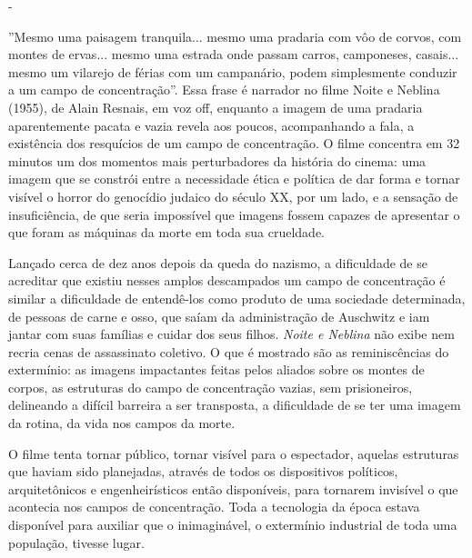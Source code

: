 -

''Mesmo uma paisagem tranquila... mesmo uma pradaria com vôo de corvos,
com montes de ervas... mesmo uma estrada onde passam carros, camponeses,
casais... mesmo um vilarejo de férias com um campanário, podem
simplesmente conduzir a um campo de concentração''. Essa frase é
narrador no filme Noite e Neblina (1955), de Alain Resnais, em voz off,
enquanto a imagem de uma pradaria aparentemente pacata e vazia revela
aos poucos, acompanhando a fala, a existência dos resquícios de um campo
de concentração. O filme concentra em 32 minutos um dos momentos mais
perturbadores da história do cinema: uma imagem que se constrói entre a
necessidade ética e política de dar forma e tornar visível o horror do
genocídio judaico do século XX, por um lado, e a sensação de
insuficiência, de que seria impossível que imagens fossem capazes de
apresentar o que foram as máquinas da morte em toda sua crueldade.

Lançado cerca de dez anos depois da queda do nazismo, a dificuldade de
se acreditar que existiu nesses amplos descampados um campo de
concentração é similar a dificuldade de entendê-los como produto de uma
sociedade determinada, de pessoas de carne e osso, que saíam da
administração de Auschwitz e iam jantar com suas famílias e cuidar dos
seus filhos. \emph{Noite e Neblina} não exibe nem recria cenas de
assassinato coletivo. O que é mostrado são as reminiscências do
extermínio: as imagens impactantes feitas pelos aliados sobre os montes
de corpos, as estruturas do campo de concentração vazias, sem
prisioneiros, delineando a difícil barreira a ser transposta, a
dificuldade de se ter uma imagem da rotina, da vida nos campos da morte.

O filme tenta tornar público, tornar visível para o espectador, aquelas
estruturas que haviam sido planejadas, através de todos os dispositivos
políticos, arquitetônicos e engenheirísticos então disponíveis, para
tornarem invisível o que acontecia nos campos de concentração. Toda a
tecnologia da época estava disponível para auxiliar que o inimaginável,
o extermínio industrial de toda uma população, tivesse lugar.


